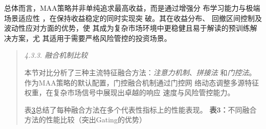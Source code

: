 \documentclass[UTF8]{ctexart}
\begin{document}
总体而言，MAA策略并非单纯追求最高收益，而是通过增强分
布学习能力与极端场景适应性 ，在保持收益稳定的同时实现突
破。其在收益分布、 回撤区间控制及波动性应对方面的优势，使
其成为复杂市场环境中更稳健且易于解读的预训练解决方案，尤
其适用于需要严格风险管控的投资场景。

\begin{quote}
\emph{4.3.3. 融合机制比较}

本节对比分析了三种主流特征融合方法：\emph{注意力机制}、\emph{拼接法}
和\emph{门控法}。作为MAA策略的默认配置，门控融合机制通过门控网
络动态调整多源特征权重，在复杂市场信号中展现出卓越的响应
\protect{}\label{bookmark48}{}速度与风险管控能力。

表\hyperref[bookmark48]{3}总结了每种融合方法在多个代表性指标上的性能表现。
\textbf{表3：}不同融合方法的性能比较（突出Gating的优势）
\end{quote}
\end{document}

